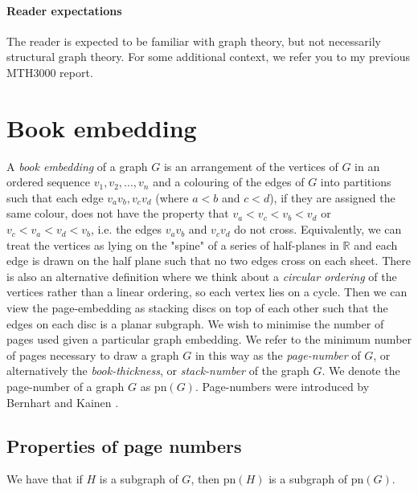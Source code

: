 \documentclass[]{article}
\newcommand{\pn}{\text{pn}}
\theoremstyle{definition}
\numberwithin{theorem}{section}
\numberwithin{equation}{section}
\begin{document}
\paragraph{Reader expectations}
The reader is expected to be familiar with graph theory, but not necessarily structural graph theory. For some additional context, we refer you to my previous MTH3000 report.



\section{Book embedding}\label{sec:Book Embedding}
A \textit{book embedding} of a graph $G$ is an arrangement of the vertices of $G$ in an ordered sequence $v_1, v_2, ..., v_n$ and a colouring of the edges of $G$ into partitions such that each edge $v_av_b, v_c v_d$ (where $a < b$ and $c < d$), if they are assigned the same colour, does not have the property that $v_a < v_c < v_b < v_d$ or $v_c < v_a < v_d < v_b$, i.e. the edges $v_a v_b$ and $v_c v_d$ do not cross. Equivalently, we can treat the vertices as lying on the "spine" of a series of half-planes in $\mathbb{R}$ and each edge is drawn on the half plane such that no two edges cross on each sheet. There is also an alternative definition where we think about a \textit{circular ordering} of the vertices rather than a linear ordering, so each vertex lies on a cycle. Then we can view the page-embedding as stacking discs on top of each other such that the edges on each disc is a planar subgraph. We wish to minimise the number of pages used given a particular graph embedding. We refer to the minimum number of pages necessary to draw a graph $G$ in this way as the \textit{page-number} of $G$, or alternatively the \textit{book-thickness}, or \textit{stack-number} of the graph $G$. We denote the page-number of a graph $G$ as $\pn(G)$. Page-numbers were introduced by Bernhart and Kainen \cite{bernhartBookThicknessGraph1979}.

\subsection{Properties of page numbers}\label{ssec:Properties_Of_Pagenumber}
We have that if $H$ is a subgraph of $G$, then $\pn(H)$ is a subgraph of $\pn(G)$. 
\end{document}
